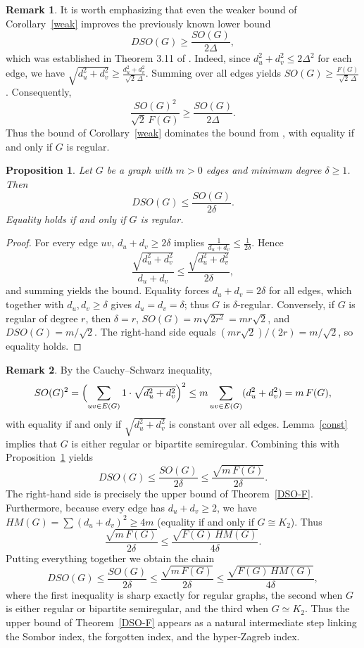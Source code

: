 \documentclass{article}
\newtheorem{proposition}{Proposition}
\theoremstyle{definition}
\newtheorem{remark}{Remark}
\begin{document}
\begin{remark}\label{remn}
It is worth emphasizing that even the weaker bound of Corollary~\ref{weak} improves the previously known lower bound
\[
DSO(G)\ge \frac{SO(G)}{2\Delta},
\]
which was established in Theorem 3.11 of \cite{5}. 
Indeed, since $d_u^2+d_v^2\le 2\Delta^2$ for each edge, we have
$
\sqrt{d_u^2+d_v^2}\ge \frac{d_u^2+d_v^2}{\sqrt{2}\,\Delta}.
$
Summing over all edges yields $SO(G)\ge \frac{F(G)}{\sqrt{2}\,\Delta}$. Consequently,
\[
\frac{SO(G)^2}{\sqrt{2}\,F(G)}
\ge \frac{SO(G)}{2\Delta}.
\]
Thus the bound of Corollary~\ref{weak}
dominates the bound from \cite{5}, with equality if and only if $G$ is regular. 
\end{remark}

\begin{proposition}\label{DSO-SO-upper}
Let $G$ be a graph with $m>0$ edges and minimum degree $\delta\ge 1$. Then
\[
DSO(G) \le \frac{SO(G)}{2\delta}.
\]
Equality holds if and only if $G$ is regular.
\end{proposition}
\begin{proof}
For every edge $uv$, $d_u+d_v \ge 2\delta$ implies $\frac{1}{d_u+d_v} \le \frac{1}{2\delta}$. Hence
\[
\frac{\sqrt{d_u^2+d_v^2}}{d_u+d_v} \le \frac{\sqrt{d_u^2+d_v^2}}{2\delta},
\]
and summing yields the bound. Equality forces $d_u+d_v = 2\delta$ for all edges, which together with $d_u,d_v\ge \delta$ gives $d_u=d_v=\delta$; thus $G$ is $\delta$-regular. Conversely, if $G$ is regular of degree $r$, then $\delta=r$,
$SO(G)=m\sqrt{2r^2}=mr\sqrt{2}$, and $DSO(G)=m/\sqrt{2}$.
The right‑hand side equals $(mr\sqrt{2})/(2r)=m/\sqrt{2}$, so equality holds.
\end{proof}

\begin{remark}\label{rem:SO-F-HM-chain}
By the Cauchy--Schwarz inequality,
\[
SO(G)^2 = \Bigl(\sum_{uv\in E(G)} 1\cdot\sqrt{d_u^2+d_v^2}\Bigr)^2
        \le m\sum_{uv\in E(G)}(d_u^2+d_v^2) = m\,F(G),
\]
with equality if and only if $\sqrt{d_u^2+d_v^2}$ is constant over all edges.
Lemma~\ref{const} implies  that $G$ is either regular or bipartite semiregular.
Combining this with Proposition~\ref{DSO-SO-upper} yields
\[
DSO(G) \le \frac{SO(G)}{2\delta} \le \frac{\sqrt{m\,F(G)}}{2\delta}.
\]
The right‑hand side is precisely the upper bound of Theorem~\ref{DSO-F}.  
Furthermore, because every edge has $d_u+d_v \ge 2$, we have $HM(G) = \sum (d_u+d_v)^2 \ge 4m$ (equality if and only if $G\cong K_2$). Thus
\[
\frac{\sqrt{m\,F(G)}}{2\delta} \le \frac{\sqrt{F(G)\,HM(G)}}{4\delta}.
\]
Putting everything together we obtain the chain
\[
DSO(G) \le \frac{SO(G)}{2\delta}
      \le \frac{\sqrt{m\,F(G)}}{2\delta}
      \le \frac{\sqrt{F(G)\,HM(G)}}{4\delta},
\]
where the first inequality is sharp exactly for regular graphs, the second when
$G$ is either regular or bipartite semiregular, and the third when $G\simeq K_2$.
Thus the upper bound of Theorem~\ref{DSO-F} appears as a natural intermediate step linking the Sombor index, the forgotten index, and the hyper‑Zagreb index.
\end{remark}
\end{document}
